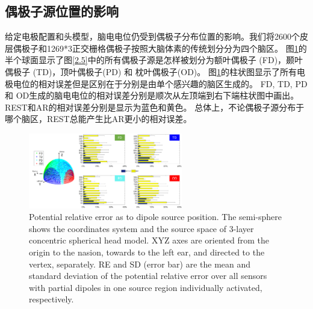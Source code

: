 \subsection{偶极子源位置的影响}
给定电极配置和头模型，脑电电位仍受到偶极子分布位置的影响。我们将2600个皮层偶极子和1269*3正交栅格偶极子按照大脑体素的传统划分分为四个脑区。 
图\ref{2.6}的半个球面显示了图\ref{2.5}中的所有偶极子源是怎样被划分为额叶偶极子 (FD)，颞叶偶极子 (TD)，顶叶偶极子(PD) 和 枕叶偶极子(OD)。 图\ref{2.6}的柱状图显示了所有电极电位的相对误差但是区别在于分别是由单个感兴趣的脑区生成的。 FD, TD, PD 
和 OD生成的脑电电位的相对误差分别是顺次从左顶端到右下端柱状图中画出。REST和AR的相对误差分别是显示为蓝色和黄色。 总体上，不论偶极子源分布于哪个脑区，REST总能产生比AR更小的相对误差。
\begin{figure}[h!]
	\centering
	\includegraphics[width=0.6\textwidth,natwidth=610,natheight=642]{pic/JNE/figure6.png}
	\caption{Potential relative error as to dipole source position. The semi-sphere shows the coordinates system and the source space of 3-layer concentric spherical head model. XYZ axes are oriented from the origin to the nasion, towards to the left ear, and directed to the vertex, separately. RE and SD (error bar) are the mean and standard deviation of the potential relative error over all sensors with partial dipoles in one source region individually activated, respectively.}
	\label{2.6}
\end{figure}

